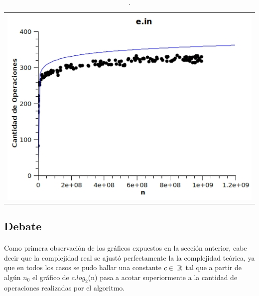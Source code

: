 	\begin{table}[ht]
		\centering 
			\begin{tabular}{c}
				\includegraphics[scale = 0.8]{./../ej1/tests/e.jpg}
			\end{tabular}
			\caption{.}
			\label{grafico4} 
	\end{table}


\subsection{Debate}

\paragraph{}
Como primera observación de los gráficos expuestos en la sección anterior, cabe decir que la complejidad real se ajustó perfectamente la la complejidad teórica, ya que en todos los casos se pudo hallar una constante $c \in\ \mathbb{R}$ tal que a partir de algún $n_0$ el gráfico de $c.log_2$(n) pasa a acotar superiormente a la cantidad de operaciones realizadas por el algoritmo.


